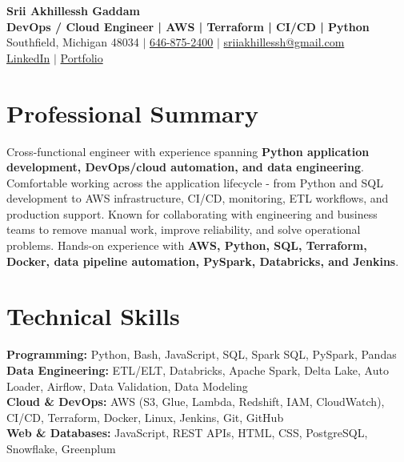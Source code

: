 \documentclass[letterpaper,10pt]{article}
\begin{document}
\fontsize{9.35pt}{10.45pt}\selectfont

\begin{center}
    {\LARGE \textbf{Srii Akhillessh Gaddam}} \\[-1pt]
    \textbf{DevOps / Cloud Engineer | AWS | Terraform | CI/CD | Python} \\[2pt]
    Southfield, Michigan 48034 $|$
    \href{tel:6468752400}{646-875-2400} $|$
    \href{mailto:sriiakhillessh@gmail.com}{sriiakhillessh@gmail.com} \\[1pt]
    \href{https://www.linkedin.com/in/srii-akhiilessh-gaddam-b48668191/}{LinkedIn} $|$
    \href{https://sriiakhillesshg.github.io/portfolio/}{Portfolio}
\end{center}
\vspace{-8pt}

\section{Professional Summary}
\small{Cross-functional engineer with experience spanning \textbf{Python application development, DevOps/cloud automation, and data engineering}. Comfortable working across the application lifecycle - from Python and SQL development to AWS infrastructure, CI/CD, monitoring, ETL workflows, and production support. Known for collaborating with engineering and business teams to remove manual work, improve reliability, and solve operational problems. Hands-on experience with \textbf{AWS, Python, SQL, Terraform, Docker, data pipeline automation, PySpark, Databricks, and Jenkins}.}

\section{Technical Skills}
\small{
\textbf{Programming:} Python, Bash, JavaScript, SQL, Spark SQL, PySpark, Pandas \\
\textbf{Data Engineering:} ETL/ELT, Databricks, Apache Spark, Delta Lake, Auto Loader, Airflow, Data Validation, Data Modeling \\
\textbf{Cloud \& DevOps:} AWS (S3, Glue, Lambda, Redshift, IAM, CloudWatch), CI/CD, Terraform, Docker, Linux, Jenkins, Git, GitHub \\
\textbf{Web \& Databases:} JavaScript, REST APIs, HTML, CSS, PostgreSQL, Snowflake, Greenplum
}
\end{document}
